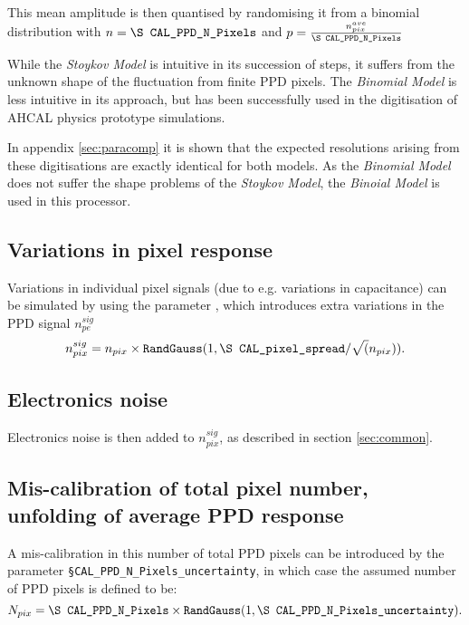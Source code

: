\documentclass[12pt]{article} %
\begin{document}
This mean amplitude is then quantised by randomising it from a binomial distribution with $n=\text{\tt \S CAL\_PPD\_N\_Pixels}$ and $p=\frac{{n}_{pix}^{ave}}{\text{\tt \S CAL\_PPD\_N\_Pixels}}$

While the \emph{Stoykov Model} is intuitive in its succession of steps, it suffers from the unknown shape of the fluctuation from finite PPD pixels. The \emph{Binomial Model} is less intuitive in its approach, but has been successfully used in the digitisation of AHCAL physics prototype simulations.

In appendix \autoref{sec:paracomp} it is shown that the expected resolutions arising from these digitisations are exactly identical for both models. As the \emph{Binomial Model} does not suffer the shape problems of the \emph{Stoykov Model}, the \emph{Binoial Model} is used in this processor.

\subsection*{Variations in pixel response}
Variations in individual pixel signals (due to e.g. variations in capacitance) can be simulated by using the parameter
, which introduces extra variations in the PPD signal $n_{pe}^{sig}$
\begin{equation*}
n_{pix}^{sig} = n_{pix} \times \text{\tt RandGauss} ( 1, \text{\tt \S CAL\_pixel\_spread} / \sqrt( n_{pix} ) ).
\end{equation*}

\subsection*{Electronics noise}
Electronics noise is then added to $n_{pix}^{sig}$, as described in section \ref{sec:common}.

\subsection*{Mis-calibration of total pixel number, unfolding of average PPD response}
A mis-calibration in this number of
total PPD pixels can be introduced by the parameter {\tt \S CAL\_PPD\_N\_Pixels\_uncertainty}, in which
case the assumed number of PPD pixels is defined to be:
\begin{equation*}
N_{pix} = \text{\tt \S CAL\_PPD\_N\_Pixels} \times
\text{\tt RandGauss}(1, \text{\tt \S CAL\_PPD\_N\_Pixels\_uncertainty}).
\end{equation*}
\end{document}
